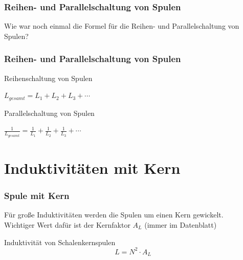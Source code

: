 \begin{frame}
  \frametitle{Reihen- und Parallelschaltung von Spulen}
  \begin{center}
    \huge Wie war noch einmal die Formel für die Reihen- und Parallelschaltung von Spulen?
  \end{center}
\end{frame}

\begin{frame}
  \frametitle{Reihen- und Parallelschaltung von Spulen}
  \begin{block}{Reihenschaltung von Spulen}
    \begin{center}
      \huge{$L_{gesamt} = L_1 + L_2 + L_3 + \cdots$}
    \end{center}
  \end{block}
  \pause
  \begin{block}{Parallelschaltung von Spulen}
    \begin{center}
      \huge{$\frac{1}{L_{gesamt}} = \frac{1}{L_1} + \frac{1}{L_2} + \frac{1}{L_3} + \cdots$}
    \end{center}
  \end{block}
\end{frame}

\section*{Induktivitäten mit Kern}

\begin{frame}
  \frametitle{Spule mit Kern}
  \begin{center}
    Für große Induktivitäten werden die Spulen um einen Kern gewickelt.\\
    Wichtiger Wert dafür ist der Kernfaktor $A_{L}$ (immer im Datenblatt)
    \begin{block}{Induktivität von Schalenkernspulen}
      \huge $$L = N^2 \cdot A_{L}$$
    \end{block}
  \end{center}
\end{frame}

